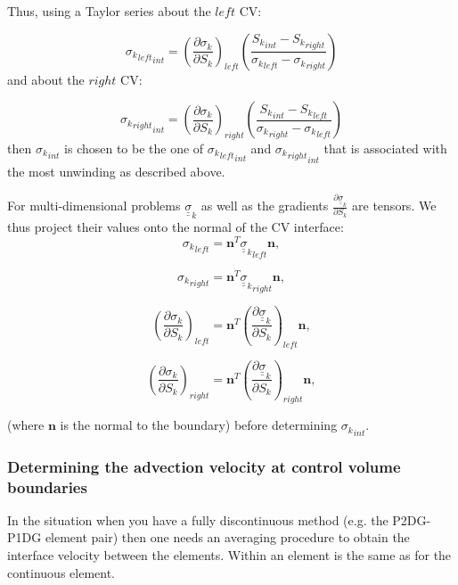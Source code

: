 Thus, using a Taylor series about the $left$ CV:

\begin{equation}
{{\sigma_k}_{left}}_{int}
=
\left(
\frac{\partial \sigma_k}{\partial {S_k}}
\right)_{left}
\left(
\frac{
 {S_k}_{int} - {S_k}_{right} }
{{\sigma_k}_{left} - {\sigma_k}_{right} }
\right)
\end{equation}
and about the $right$ CV:

\begin{equation}
{{\sigma_k}_{right}}_{int}
=
\left( \frac{\partial \sigma_k}{\partial {S_k}}
\right)_{right}
\left(
\frac{
 {S_k}_{int} - {S_k}_{left} }
{{\sigma_k}_{right} - {\sigma_k}_{left} }
\right)
\end{equation}
then ${{\sigma_k}}_{int}$ is chosen to be the one
of ${{\sigma_k}_{left}}_{int}$ and ${{\sigma_k}_{right}}_{int}$
that is associated with the most unwinding as described above.


For multi-dimensional problems ${\underline {\underline \sigma}}_k$ as well
as the gradients $\frac{\partial {\underline {\underline \sigma}}_k}{\partial S_k}$
are tensors. We thus project their values
onto the normal of the CV interface:
\begin{equation}
{\sigma_k}_{left} = {\mathbf n}^T {{\underline {\underline \sigma}}_k}_{left} {\mathbf n},
\end{equation}

\begin{equation}
{\sigma_k}_{right} = {\mathbf n}^T {{\underline {\underline \sigma}}_k}_{right} {\mathbf n},
\end{equation}

\begin{equation}
\left({\frac{\partial \sigma_k}{\partial S_k}}\right)_{left} =
{\mathbf n}^T \left( {\frac{\partial {\underline {\underline \sigma}}_k}{\partial S_k}}\right)_{left} {\mathbf n},
\end{equation}

\begin{equation}
\left({\frac{\partial \sigma_k}{\partial S_k}}\right)_{right} = {\mathbf n}^T
\left( \frac{\partial {\underline {\underline \sigma}}_k}{\partial S_k}\right)_{right} {\mathbf n},
\end{equation}

(where ${\mathbf n}$ is the normal to the boundary)
before determining ${\sigma_k}_{int}$.




\subsubsection{Determining the advection velocity at control volume boundaries}
In the situation when you have a fully discontinuous method (e.g. the P2DG-P1DG element pair) then
one needs an averaging procedure to obtain the interface velocity between the elements.
Within an element is the same as for the continuous element.



